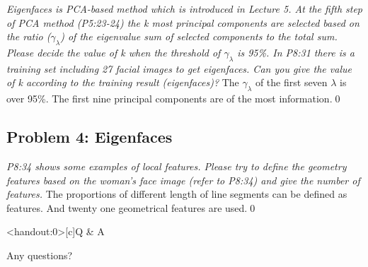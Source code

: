 \documentclass[
        ]{beamer}
\begin{document}
\begin{frame}[t]{\subsecname}
	\begin{overprint}
	\emph{Eigenfaces is PCA-based method which is introduced in Lecture 5. At the fifth step of PCA method (P5:23-24) the k most principal components are selected based on the ratio ($\gamma_{\lambda}$) of the eigenvalue sum of selected components to the total sum. Please decide the value of k when the threshold of $\gamma_{\lambda}$ is 95\%. In P8:31 there is a training set including 27 facial images to get eigenfaces. Can you give the value of k according to the training result (eigenfaces)?}
		\onslide<2>  %
		\onslide<3>  %
		The $\gamma_{\lambda}$ of the first \alert{seven} $\lambda$ is over 95\%.
		\onslide<4>  %
		\small{The first \alert{nine} principal components are of the most information.}\qed
	\end{overprint}
\end{frame}
		
\subsection{Problem 4: Eigenfaces}

\begin{frame}[t]{\subsecname}
	\begin{overprint}
	\onslide<1>
	\emph{P8:34 shows some examples of local features. Please try to define the geometry features based on the woman's face image (refer to P8:34) and give the number of features.}
		\onslide<2> \inpdfc{8}{34} 
		\small{The proportions of different length of line segments can be defined as features. And \alert{twenty one} geometrical features are used.}\qed
	\end{overprint}
\end{frame}   


\begin{frame}<handout:0>[c]{Q \& A}
    \centerline{\Large{Any questions?}}
\end{frame}
\end{document}
